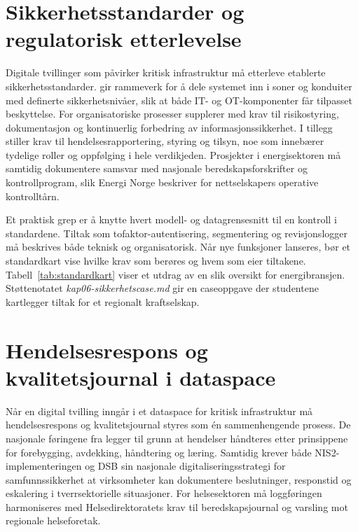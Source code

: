 \section{Sikkerhetsstandarder og regulatorisk etterlevelse}
Digitale tvillinger som påvirker kritisk infrastruktur må etterleve etablerte sikkerhetsstandarder. \citet{iec62443-2-1} gir rammeverk for å dele systemet inn i soner og konduiter med definerte sikkerhetsnivåer, slik at både IT- og OT-komponenter får tilpasset beskyttelse. For organisatoriske prosesser supplerer \citet{iso27001-2022} med krav til risikostyring, dokumentasjon og kontinuerlig forbedring av informasjonssikkerhet. I tillegg stiller \citet{eu2022nis2} krav til hendelsesrapportering, styring og tilsyn, noe som innebærer tydelige roller og oppfølging i hele verdikjeden. Prosjekter i energisektoren må samtidig dokumentere samsvar med nasjonale beredskapsforskrifter og kontrollprogram, slik Energi Norge beskriver for nettselskapers operative kontrolltårn.\citep{energinorge2023beredskap}

Et praktisk grep er å knytte hvert modell- og datagrensesnitt til en kontroll i standardene. Tiltak som tofaktor-autentisering, segmentering og revisjonslogger må beskrives både teknisk og organisatorisk. Når nye funksjoner lanseres, bør et standardkart vise hvilke krav som berøres og hvem som eier tiltakene. Tabell~\ref{tab:standardkart} viser et utdrag av en slik oversikt for energibransjen. Støttenotatet \textit{kap06-sikkerhetscase.md} gir en caseoppgave der studentene kartlegger tiltak for et regionalt kraftselskap.

\section{Hendelsesrespons og kvalitetsjournal i dataspace}
Når en digital tvilling inngår i et dataspace for kritisk infrastruktur må hendelsesrespons og kvalitetsjournal styres som én sammenhengende prosess. De nasjonale føringene fra \citet{nsm2023grunnprinsipper} legger til grunn at hendelser håndteres etter prinsippene for forebygging, avdekking, håndtering og læring. Samtidig krever både NIS2-implementeringen og DSB sin nasjonale digitaliseringsstrategi for samfunnssikkerhet at virksomheter kan dokumentere beslutninger, responstid og eskalering i tverrsektorielle situasjoner.\citep{dsb2024nser} For helsesektoren må loggføringen harmoniseres med Helsedirektoratets krav til beredskapsjournal og varsling mot regionale helseforetak.\citep{helsedir2023beredskap}

